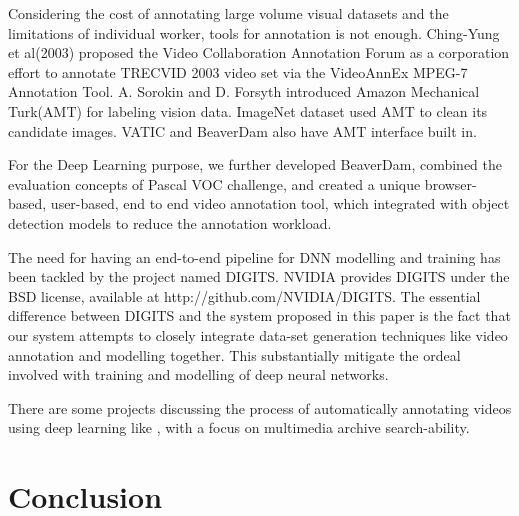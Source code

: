 \documentclass[conference]{IEEEtran}
\begin{document}
Considering the cost of annotating large volume visual datasets and the limitations of individual worker, tools for annotation is not enough. Ching-Yung et al(2003)\cite{lin2003videoann} proposed the Video Collaboration Annotation Forum as a corporation effort to annotate TRECVID\cite{smeaton2006trecvid} 2003 video set via the VideoAnnEx MPEG-7 Annotation Tool. A. Sorokin and D. Forsyth introduced Amazon Mechanical Turk(AMT)\cite{sorokin2008amt} for labeling vision data. ImageNet\cite{deng2009imgnet} dataset used AMT to clean its candidate images. VATIC and BeaverDam also have AMT interface built in. 

For the Deep Learning purpose, we further developed BeaverDam, combined the evaluation concepts of Pascal VOC challenge\cite{everingham2010vocchallenge}, and created a unique browser-based, user-based, end to end video annotation tool, which integrated with object detection models to reduce the annotation workload.

The need for having an end-to-end pipeline for DNN modelling and training has been tackled by the project named DIGITS. NVIDIA provides DIGITS under the BSD license, available at http://github.com/NVIDIA/DIGITS. The essential difference between DIGITS and the system proposed in this paper is the fact that our system attempts to closely integrate data-set generation techniques like video annotation and modelling together. This substantially mitigate the ordeal involved with training and modelling of deep neural networks.

There are some projects discussing the process of automatically annotating videos using deep learning like \cite{baptist2016automatedendtoend}, with a focus on multimedia archive search-ability. 

\section{Conclusion}\label{sec.conclusion}











\end{document}
